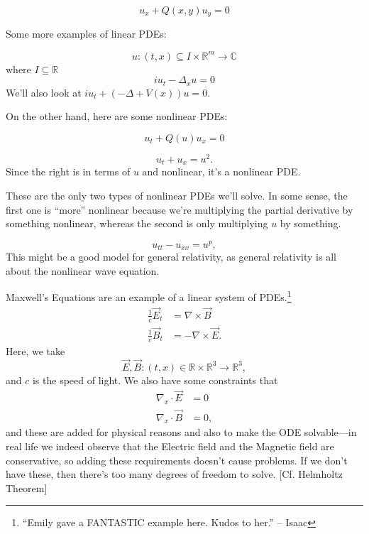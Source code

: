\begin{example}
\[ u_{x} + Q(x, y) u_{y} = 0 \]
\end{example}

\noindent Some more examples of linear PDEs:
\begin{example}
\[ u : (t, x) \subseteq  I \times \mathbb{R}^{m} \to \mathbb{C} \]
where \( I \subseteq \mathbb{R} \)
\[ i u_{t} - \Delta_{x} u = 0 \]
We'll also look at \( i u_{t} + (- \Delta + V(x)) u = 0 \).
\end{example}

\noindent On the other hand, here are some nonlinear PDEs:
\begin{example}
\[ u_{t} + Q(u) u_{x} = 0 \]
\end{example}
\begin{example}
\[ u_{t} + u_{x} = u^{2}. \]
Since the right is in terms of \( u \) and nonlinear, it's a nonlinear PDE. 
\end{example}
These are the only two types of nonlinear PDEs we'll solve. In some sense, the first one is ``more'' nonlinear because we're multiplying the partial derivative by something nonlinear, whereas the second is only multiplying \( u \) by something.

\begin{example}
\[ u_{tt} - u_{x x} = u^{p}, \]
This might be a good model for general relativity, as general relativity is all about the nonlinear wave equation.
\end{example}

\begin{example}
	Maxwell's Equations are an example of a linear system of PDEs.\footnote{``Emily gave a FANTASTIC example here. Kudos to her.'' -- Isaac}
\begin{align*}
	\frac{1}{c} \vec E_{t} &= \nabla \times \vec B \\
	\frac{1}{c} \vec B_{t} &= - \nabla \times \vec E.
\end{align*}
Here, we take
\[ \vec E, \vec B : (t, x) \in \mathbb{R} \times \mathbb{R}^{3} \to \mathbb{R}^{3}, \]
and \( c \) is the speed of light. We also have some constraints that
\begin{align*}
	\nabla_{x} \cdot \vec E &= 0 \\
	\nabla_{x} \cdot \vec B &= 0,
\end{align*}
and these are added for physical reasons and also to make the ODE solvable---in real life we indeed observe that the Electric field and the Magnetic field are conservative, so adding these requirements doesn't cause problems. If we don't have these, then there's too many degrees of freedom to solve. [Cf. Helmholtz Theorem]
\end{example}

